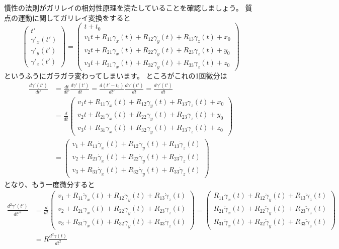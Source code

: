 慣性の法則がガリレイの相対性原理を満たしていることを確認しましょう。
質点の運動に関してガリレイ変換をすると
\[
  \begin{pmatrix}
    t'\\
    \gamma'_x(t')\\
    \gamma'_y(t')\\
    \gamma'_z(t')
  \end{pmatrix}
  =
  \begin{pmatrix}
    t+t_0\\
    v_1t+R_{11}\gamma_x(t)+R_{12}\gamma_y(t)+R_{13}\gamma_z(t)+x_0\\
    v_2t+R_{21}\gamma_x(t)+R_{22}\gamma_y(t)+R_{23}\gamma_z(t)+y_0\\
    v_3t+R_{31}\gamma_x(t)+R_{32}\gamma_y(t)+R_{33}\gamma_z(t)+z_0
  \end{pmatrix}
\]
というふうにガラガラ変わってしまいます。
ところがこれの1回微分は
\begin{align*}
  \frac{d\gamma'(t')}{dt'}&=\frac{dt}{dt'}\frac{d\gamma'(t')}{dt}=\frac{d(t'-t_0)}{dt'}\frac{d\gamma'(t')}{dt}=\frac{d\gamma'(t')}{dt}\\
  &=\frac{d}{dt}
  \begin{pmatrix}
    v_1t+R_{11}\gamma_x(t)+R_{12}\gamma_y(t)+R_{13}\gamma_z(t)+x_0\\
    v_2t+R_{21}\gamma_x(t)+R_{22}\gamma_y(t)+R_{23}\gamma_z(t)+y_0\\
    v_3t+R_{31}\gamma_x(t)+R_{32}\gamma_y(t)+R_{33}\gamma_z(t)+z_0
  \end{pmatrix}\\
  &=
  \begin{pmatrix}
    v_1+R_{11}\dot\gamma_x(t)+R_{12}\dot\gamma_y(t)+R_{13}\dot\gamma_z(t)\\
    v_2+R_{21}\dot\gamma_x(t)+R_{22}\dot\gamma_y(t)+R_{23}\dot\gamma_z(t)\\
    v_3+R_{31}\dot\gamma_x(t)+R_{32}\dot\gamma_y(t)+R_{33}\dot\gamma_z(t)
  \end{pmatrix}
\end{align*}
となり、もう一度微分すると
\begin{align*}
  \frac{d^2\gamma'(t')}{dt'^2}&=\frac{d}{dt}
  \begin{pmatrix}
    v_1+R_{11}\dot\gamma_x(t)+R_{12}\dot\gamma_y(t)+R_{13}\dot\gamma_z(t)\\
    v_2+R_{21}\dot\gamma_x(t)+R_{22}\dot\gamma_y(t)+R_{23}\dot\gamma_z(t)\\
    v_3+R_{31}\dot\gamma_x(t)+R_{32}\dot\gamma_y(t)+R_{33}\dot\gamma_z(t)
  \end{pmatrix}
  =
  \begin{pmatrix}
    R_{11}\ddot\gamma_x(t)+R_{12}\ddot\gamma_y(t)+R_{13}\ddot\gamma_z(t)\\
    R_{21}\ddot\gamma_x(t)+R_{22}\ddot\gamma_y(t)+R_{23}\ddot\gamma_z(t)\\
    R_{31}\ddot\gamma_x(t)+R_{32}\ddot\gamma_y(t)+R_{33}\ddot\gamma_z(t)
  \end{pmatrix}\\
  &=R\frac{d^2\gamma(t)}{dt^2}
\end{align*}
